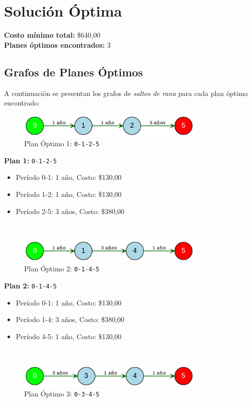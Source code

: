 \documentclass[12pt]{article}
\begin{document}
\clearpage
\section*{Solución Óptima}
\textbf{Costo mínimo total:} \$640,00\\
\textbf{Planes óptimos encontrados:} 3\\
\subsection*{Grafos de Planes Óptimos}
A continuación se presentan los grafos de \emph{saltos de rana} para cada plan óptimo encontrado:\\

\begin{figure}[H]
\centering
\includegraphics[width=0.8\textwidth]{ReemplazoEquipos11_plan_1.png}
\caption{Plan Óptimo 1: \texttt{0-1-2-5}}
\label{fig:plan1}
\end{figure}

\textbf{Plan 1:} \texttt{0-1-2-5}\\
\begin{itemize}\small
\item Período 0-1: 1 año, Costo: \$130,00
\item Período 1-2: 1 año, Costo: \$130,00
\item Período 2-5: 3 años, Costo: \$380,00
\end{itemize}
\\
\begin{figure}[H]
\centering
\includegraphics[width=0.8\textwidth]{ReemplazoEquipos11_plan_2.png}
\caption{Plan Óptimo 2: \texttt{0-1-4-5}}
\label{fig:plan2}
\end{figure}

\textbf{Plan 2:} \texttt{0-1-4-5}\\
\begin{itemize}\small
\item Período 0-1: 1 año, Costo: \$130,00
\item Período 1-4: 3 años, Costo: \$380,00
\item Período 4-5: 1 año, Costo: \$130,00
\end{itemize}
\\
\begin{figure}[H]
\centering
\includegraphics[width=0.8\textwidth]{ReemplazoEquipos11_plan_3.png}
\caption{Plan Óptimo 3: \texttt{0-3-4-5}}
\label{fig:plan3}
\end{figure}
\end{document}

